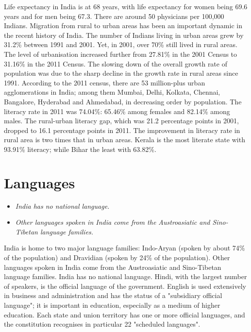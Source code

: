Life expectancy in India is at 68 years, with life expectancy for women
being 69.6 years and for men being 67.3. There are around 50 physicians
per 100,000 Indians. Migration from rural to urban areas has been an
important dynamic in the recent history of India. The number of Indians
living in urban areas grew by 31.2\% between 1991 and 2001. Yet, in
2001, over 70\% still lived in rural areas. The level of urbanisation
increased further from 27.81\% in the 2001 Census to 31.16\% in the 2011
Census. The slowing down of the overall growth rate of population was
due to the sharp decline in the growth rate in rural areas since 1991.
According to the 2011 census, there are 53 million-plus urban
agglomerations in India; among them Mumbai, Delhi, Kolkata, Chennai,
Bangalore, Hyderabad and Ahmedabad, in decreasing order by population.
The literacy rate in 2011 was 74.04\%: 65.46\% among females and 82.14\%
among males. The rural-urban literacy gap, which was 21.2 percentage
points in 2001, dropped to 16.1 percentage points in 2011. The
improvement in literacy rate in rural area is two times that in urban
areas. Kerala is the most literate state with 93.91\% literacy; while
Bihar the least with 63.82\%.

\section{Languages}\label{languages}

\begin{itemize}
\item
  \emph{India has no national language.}
\item
  \emph{Other languages spoken in India come from the Austroasiatic and
  Sino-Tibetan language families.}
\end{itemize}

India is home to two major language families: Indo-Aryan (spoken by
about 74\% of the population) and Dravidian (spoken by 24\% of the
population). Other languages spoken in India come from the Austroasiatic
and Sino-Tibetan language families. India has no national language.
Hindi, with the largest number of speakers, is the official language of
the government. English is used extensively in business and
administration and has the status of a "subsidiary official language";
it is important in education, especially as a medium of higher
education. Each state and union territory has one or more official
languages, and the constitution recognises in particular 22 "scheduled
languages".

